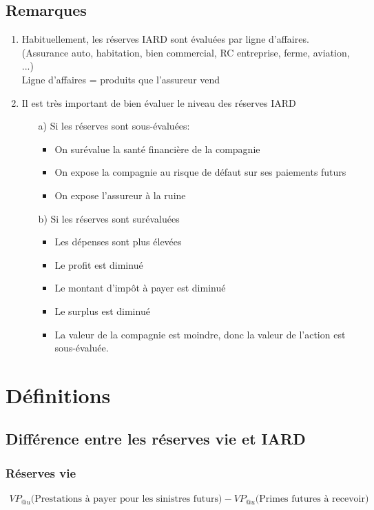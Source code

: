 \subsection*{Remarques}
\begin{enumerate}
\item Habituellement, les réserves IARD sont évaluées par ligne d'affaires. (Assurance auto, habitation, bien commercial, RC entreprise, ferme, aviation, ...)
\\
Ligne d'affaires = produits que l'assureur vend
\item Il est très important de bien évaluer le niveau des réserves IARD
	\begin{itemize}
	\item[a)] Si les réserves sont sous-évaluées:
		\begin{itemize}
		\item On surévalue la santé financière de la compagnie
		\item On expose la compagnie au risque de défaut sur ses paiements futurs
		\item On expose l'assureur à la ruine
		\end{itemize}
	\item[b)] Si les réserves sont surévaluées
		\begin{itemize}
		\item Les dépenses sont plus élevées
		\item Le profit est diminué
		\item Le montant d'impôt à payer est diminué
		\item Le surplus est diminué
		\item La valeur de la compagnie est moindre, donc la valeur de l'action est sous-évaluée.
\end{itemize}				
	\end{itemize}
\end{enumerate}

\section{Définitions}

\subsection*{Différence entre les réserves vie et IARD}
\subsubsection*{Réserves vie}
\begin{align*}
VP_{@u}\Big(\text{Prestations à payer pour les sinistres futurs} \Big) - VP_{@u}\Big(\text{Primes futures à recevoir} \Big)
\end{align*}
